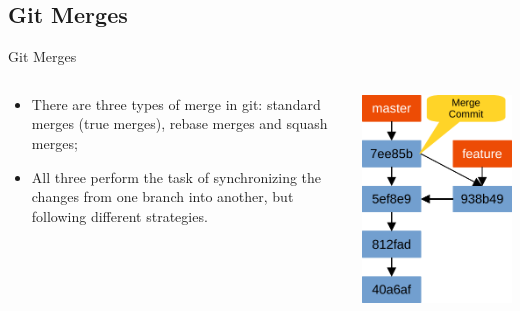 \documentclass{beamer}
\begin{document}
\subsection{Git Merges}
\begin{frame}{Git Merges}
  \begin{columns}
    \begin{column}{0.6\textwidth}
      \begin{itemize}
        \item There are three types of merge in git: standard merges (true merges), rebase merges and squash merges;
        \item All three perform the task of synchronizing the changes from one branch into another, but following different strategies.
      \end{itemize}
    \end{column}
    \begin{column}{0.4\textwidth}
      \begin{center}
        \includegraphics[scale=0.5]{git-merge}
      \end{center}
    \end{column}
  \end{columns}
\end{frame}
\end{document}
